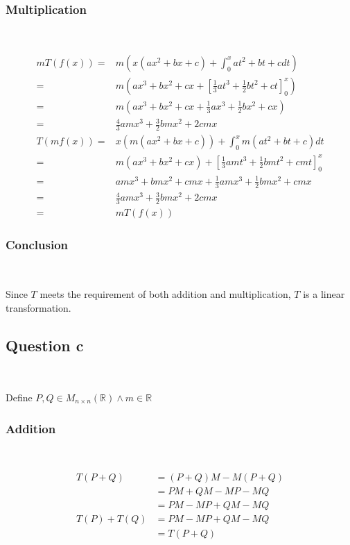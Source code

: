 \documentclass{article}
\def\R{\mathbb{R}}
\begin{document}
\subsubsection{Multiplication}

~

\begin{equation}
\tag{3.2.2}
\begin{split}
mT(f(x))=&m(x(ax^2+bx+c)+\int_{0}^{x}at^2+bt+cdt)\\
=&m(ax^3+bx^2+cx+\left[\frac{1}{3}at^3+\frac{1}{2}bt^2+ct\right]_{0}^{x})\\
=&m(ax^3+bx^2+cx+\frac{1}{3}ax^3+\frac{1}{2}bx^2+cx)\\
=&\frac{4}{3}amx^3+\frac{3}{2}bmx^2+2cmx\\
T(mf(x))=&x(m(ax^2+bx+c))+\int_{0}^{x}m(at^2+bt+c)dt\\
=&m(ax^3+bx^2+cx)+\left[\frac{1}{3}amt^3+\frac{1}{2}bmt^2+cmt\right]_{0}^{x}\\
=&amx^3+bmx^2+cmx+\frac{1}{3}amx^3+\frac{1}{2}bmx^2+cmx\\
=&\frac{4}{3}amx^3+\frac{3}{2}bmx^2+2cmx\\
=&mT(f(x))
\end{split}
\end{equation}

\subsubsection{Conclusion}

~

Since $T$ meets the requirement of both addition and multiplication, $T$ is a linear transformation.

\subsection{Question c}

~

Define $P,Q\in M_{n\times n}(\R)\land m\in\R$

\subsubsection{Addition}

~

\begin{equation}
\tag{3.3.1}
\begin{split}
T(P+Q)&=(P+Q)M-M(P+Q)\\
&=PM+QM-MP-MQ\\
&=PM-MP+QM-MQ\\
T(P)+T(Q)&=PM-MP+QM-MQ\\
&=T(P+Q)\\
\end{split}
\end{equation}
\end{document}
